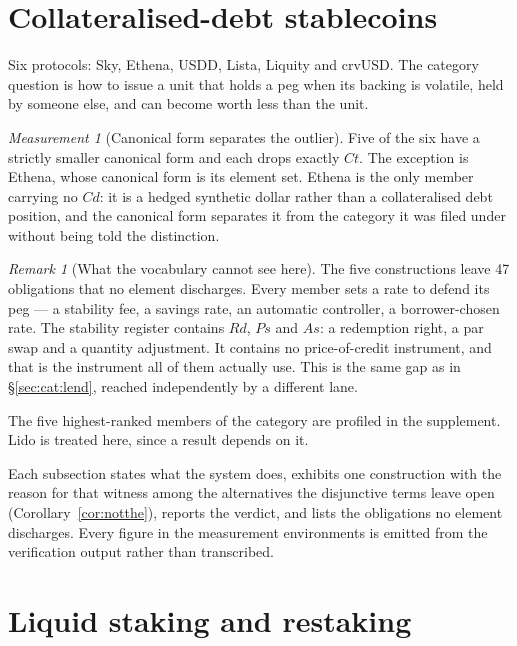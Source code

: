 \documentclass[11pt,reqno]{amsart}
\theoremstyle{plain}
\theoremstyle{definition}
\theoremstyle{remark}
\newtheorem{measurement}[theorem]{Measurement}
\newtheorem{remark}[theorem]{Remark}
\begin{document}
\section{Collateralised-debt stablecoins}\label{sec:cat:cdp}

Six protocols: Sky, Ethena, USDD, Lista, Liquity and crvUSD. The category
question is how to issue a unit that holds a peg when its backing is volatile,
held by someone else, and can become worth less than the unit.

\begin{measurement}[Canonical form separates the outlier]\label{meas:cat:cdpex}
Five of the six have a strictly smaller canonical form and each drops exactly
$Ct$. The exception is Ethena, whose canonical form is its element set. Ethena
is the only member carrying no $Cd$: it is a hedged synthetic dollar rather than
a collateralised debt position, and the canonical form separates it from the
category it was filed under without being told the distinction.
\end{measurement}

\begin{remark}[What the vocabulary cannot see here]
The five constructions leave 47 obligations that no element discharges.
Every member sets a rate to defend its peg --- a stability fee, a savings rate,
an automatic controller, a borrower-chosen rate. The stability register contains
$Rd$, $Ps$ and $As$: a redemption right, a par swap and a quantity adjustment.
It contains no price-of-credit instrument, and that is the instrument all of
them actually use. This is the same gap as in \S\ref{sec:cat:lend}, reached
independently by a different lane.
\end{remark}

The five highest-ranked members of the category are profiled in the
supplement. Lido is treated here, since a result depends on it.

Each
subsection states what the system does, exhibits one construction with the
reason for that witness among the alternatives the disjunctive terms leave open
(Corollary~\ref{cor:notthe}), reports the verdict, and lists the obligations no
element discharges. Every figure in the measurement environments is emitted from
the verification output rather than transcribed.

\section{Liquid staking and restaking}\label{sec:cat:lsd}
\end{document}
